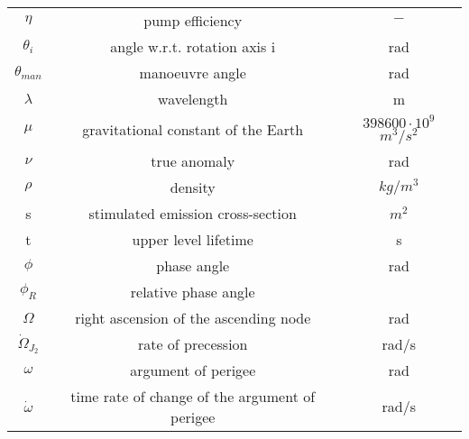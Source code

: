 \documentclass{report}
\begin{document}
\begin{table}
\begin{tabular}{c|c|c}
         $\eta$ & pump efficiency &          $-$ \\

        $\theta _i$ & angle w.r.t. rotation axis i &        rad \\

      $\theta _{man}$ & manoeuvre angle &        rad \\

         $\lambda$ & wavelength &          m \\

         $\mu$ & gravitational constant of the Earth & $398600\cdot 10^9$ $m^3/s^2$ \\

         $\nu$ & true anomaly &        rad \\

         $\rho$ &    density &      $kg/m^3$ \\

         s & stimulated emission cross-section &         $m^2$ \\

         t & upper level lifetime &          s \\

         $\phi$ & phase angle &        rad \\

        $\phi _R$ & relative phase angle &            \\

         $\Omega$  & right ascension of the ascending node &        rad \\

$\dot \Omega _{J_2 }$ & rate of precession &      rad/s \\

         $\omega$ & argument of perigee &        rad \\

$\dot \omega$ & time rate of change of the argument of perigee &      rad/s\\

\end{tabular}  
\end{table}
\end{document}
